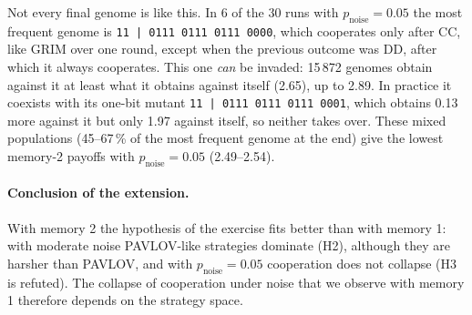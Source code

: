 \documentclass[10pt,a4paper]{article}
\newcommand{\pn}{p_{\text{noise}}}
\newcommand{\g}[1]{\texttt{#1}}   %
\begin{document}
Not every final genome is like this. In 6 of the 30 runs with $\pn=0.05$ the most frequent genome is
\g{11\,|\,0111\,0111\,0111\,0000}, which cooperates only after CC, like GRIM over one round, except when
the previous outcome was DD, after which it always cooperates. This one \emph{can} be invaded:
15\,872 genomes obtain against it at least what it obtains against itself (2.65), up to 2.89. In practice
it coexists with its one-bit mutant \g{11\,|\,0111\,0111\,0111\,0001}, which obtains 0.13 more against it
but only 1.97 against itself, so neither takes over. These mixed populations (45--67\,\% of the most
frequent genome at the end) give the lowest memory-2 payoffs with $\pn=0.05$ (2.49--2.54).

\paragraph{Conclusion of the extension.} With memory 2 the hypothesis of the exercise fits better than with
memory 1: with moderate noise PAVLOV-like strategies dominate (H2), although they are harsher than PAVLOV,
and with $\pn=0.05$ cooperation does not collapse (H3 is refuted). The collapse of cooperation under noise
that we observe with memory 1 therefore depends on the strategy space.

\end{document}
